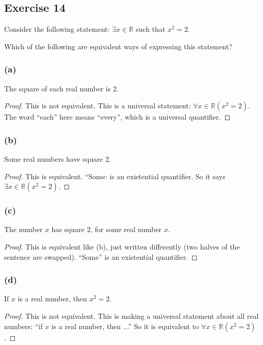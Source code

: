 \documentclass[14pt]{extarticle}
\newcommand{\R}{\mathbb{R}}
\newcommand{\fa}{\forall}
\newcommand{\te}{\exists}
\begin{document}
\subsection{Exercise 14}
Consider the following statement: $\te x \in \R$ such that $x^2 = 2$.

Which of the following are equivalent ways of expressing this statement?

\subsubsection{(a)}
The square of each real number is 2.

\begin{proof}
    This is not equivalent. This is a universal statement: $\fa x \in \R(x^2 = 2)$. The word ``each'' here means ``every'', which is a universal quantifier.
\end{proof}

\subsubsection{(b)}
Some real numbers have square 2.

\begin{proof}
    This is equivalent. ``Some: is an existential quantifier. So it says $\te x \in \R (x^2 = 2)$.
\end{proof}

\subsubsection{(c)}
The number $x$ has square 2, for some real number $x$.

\begin{proof}
    This is equivalent like (b), just written differently (two halves of the sentence are swapped). ``Some'' is an existential quantifier.
\end{proof}

\subsubsection{(d)}
If $x$ is a real number, then $x^2 = 2$.

\begin{proof}
    This is not equivalent. This is making a universal statement about all real numbers: ``if $x$ is a real number, then ...'' So it is equivalent to $\fa x \in \R (x^2 = 2)$.
\end{proof}
\end{document}

